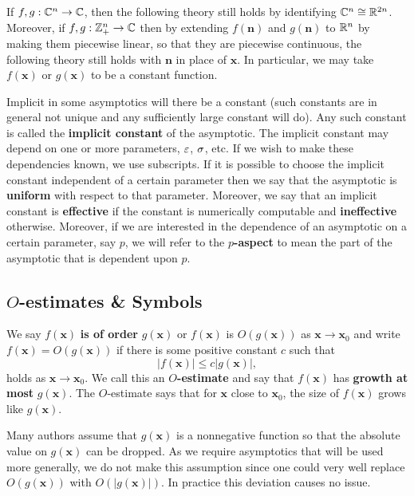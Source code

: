    \begin{remark}
      If $f,g: \mathbb{C}^{n} \to \mathbb{C}$, then the following theory still holds by identifying $\mathbb{C}^{n} \cong \mathbb{R}^{2n}$. Moreover, if $f,g:\mathbb{Z}_{+}^{n} \to \mathbb{C}$ then by extending $f(\mathbf{n})$ and $g(\mathbf{n})$ to $\mathbb{R}^{n}$ by making them piecewise linear, so that they are piecewise continuous, the following theory still holds with $\mathbf{n}$ in place of $\mathbf{x}$. In particular, we may take $f(\mathbf{x})$ or $g(\mathbf{x})$ to be a constant function.
    \end{remark}

    Implicit in some asymptotics will there be a constant (such constants are in general not unique and any sufficiently large constant will do). Any such constant is called the \textbf{implicit constant} of the asymptotic. The implicit constant may depend on one or more parameters, $\varepsilon$, $\sigma$, etc. If we wish to make these dependencies known, we use subscripts. If it is possible to choose the implicit constant independent of a certain parameter then we say that the asymptotic is \textbf{uniform} with respect to that parameter. Moreover, we say that an implicit constant is \textbf{effective} if the constant is numerically computable and \textbf{ineffective} otherwise. Moreover, if we are interested in the dependence of an asymptotic on a certain parameter, say $p$, we will refer to the \textbf{$p$-aspect} to mean the part of the asymptotic that is dependent upon $p$.
    \subsection*{\texorpdfstring{$O$}{O}-estimates \& Symbols}
      We say $f(\mathbf{x})$ \textbf{is of order} $g(\mathbf{x})$ or $f(\mathbf{x})$ is $O(g(\mathbf{x}))$ as $\mathbf{x} \to \mathbf{x}_{0}$ and write $f(\mathbf{x}) = O(g(\mathbf{x}))$
      if there is some positive constant $c$ such that
      \[
        |f(\mathbf{x})| \le c|g(\mathbf{x})|,
      \]
      holds as $\mathbf{x} \to \mathbf{x}_{0}$. We call this an \textbf{$O$-estimate} and say that $f(\mathbf{x})$ has \textbf{growth at most} $g(\mathbf{x})$. The $O$-estimate says that for $\mathbf{x}$ close to $\mathbf{x}_{0}$, the size of $f(\mathbf{x})$ grows like $g(\mathbf{x})$.
      
      \begin{remark}
        Many authors assume that $g(\mathbf{x})$ is a nonnegative function so that the absolute value on $g(\mathbf{x})$ can be dropped. As we require asymptotics that will be used more generally, we do not make this assumption since one could very well replace $O(g(\mathbf{x}))$ with $O(|g(\mathbf{x})|)$. In practice this deviation causes no issue.
      \end{remark}
      
